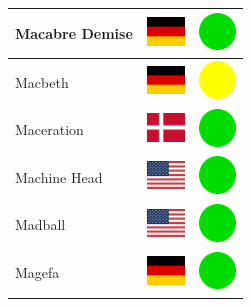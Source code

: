 \documentclass[12pt, a4paper, twoside]{report}
\begin{document}
\begin{center}
\begin{longtable}{|p{5cm}|p{2cm}|p{2cm}|}
 Macabre Demise                                             & \includegraphics[width=1cm]{../img/flags/de} &   \includegraphics[width=1cm]{../likes/y} \\ \hline
 Macbeth                                                    & \includegraphics[width=1cm]{../img/flags/de} &   \includegraphics[width=1cm]{../likes/m} \\ \hline
 Maceration                                                 & \includegraphics[width=1cm]{../img/flags/dk} &   \includegraphics[width=1cm]{../likes/y} \\ \hline
 Machine Head                                               & \includegraphics[width=1cm]{../img/flags/us} &   \includegraphics[width=1cm]{../likes/y} \\ \hline
 Madball                                                    & \includegraphics[width=1cm]{../img/flags/us} &   \includegraphics[width=1cm]{../likes/y} \\ \hline
 Magefa                                                     & \includegraphics[width=1cm]{../img/flags/de} &   \includegraphics[width=1cm]{../likes/y} \\ \hline

\end{longtable}
\end{center}
\end{document}
